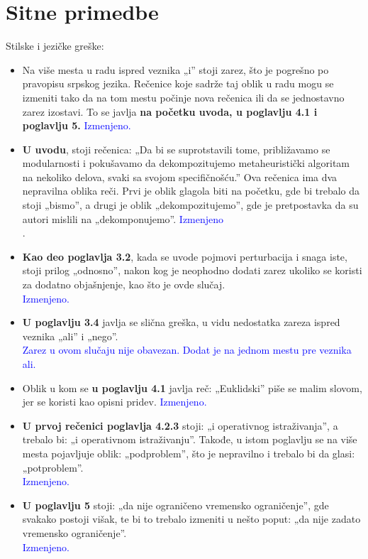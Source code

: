 \documentclass[a4paper]{report}
\newcommand{\odgovor}[1]{\textcolor{blue}{#1}}
\begin{document}
\section{Sitne primedbe}
Stilske i jezičke greške:
\begin{itemize}
 \item Na više mesta u radu ispred veznika „i” stoji zarez, što je pogrešno po pravopisu srpskog jezika. Rečenice koje sadrže taj oblik u radu mogu se izmeniti tako da na tom mestu počinje nova rečenica ili da se jednostavno zarez izostavi. To se javlja \textbf{na početku uvoda, u poglavlju 4.1 i poglavlju 5.}
 \odgovor{Izmenjeno.\\}
 
 \item \textbf{U uvodu}, stoji rečenica: „Da bi se suprotstavili tome, približavamo se modularnosti i pokušavamo da dekompozitujemo metaheuristički algoritam na nekoliko delova, svaki sa svojom specifičnošću.” Ova rečenica ima dva nepravilna oblika reči. Prvi je oblik glagola biti na početku, gde bi trebalo da stoji „bismo”, a drugi je oblik „dekompozitujemo”, gde je pretpostavka da su autori mislili na „dekomponujemo”.
 \odgovor{Izmenjeno\\}.
 
 \item \textbf{Kao deo poglavlja 3.2}, kada se uvode pojmovi perturbacija i snaga iste, stoji prilog „odnosno”, nakon kog je neophodno dodati zarez ukoliko se koristi za dodatno objašnjenje, kao što je ovde slučaj.\\
 \odgovor{Izmenjeno.\\}
 
 \item \textbf{U poglavlju 3.4} javlja se slična greška, u vidu nedostatka zareza ispred veznika „ali” i „nego”.\\
 \odgovor{Zarez u ovom slučaju nije obavezan. Dodat je na jednom mestu pre veznika ali.\\}
 
 \item Oblik u kom se \textbf{u poglavlju 4.1} javlja reč: „Euklidski” piše se malim slovom, jer se koristi kao opisni pridev.
 \odgovor{Izmenjeno.\\}
 \item \textbf{U prvoj rečenici poglavlja 4.2.3} stoji: „i operativnog istraživanja”, a trebalo bi: „i operativnom istraživanju”. Takođe, u istom poglavlju se na više mesta pojavljuje oblik: „podproblem”, što je nepravilno i trebalo bi da glasi: „potproblem”.\\
\odgovor{Izmenjeno.\\}
 
 \item \textbf{U poglavlju 5} stoji: „da nije ograničeno vremensko ograničenje”, gde svakako postoji višak, te bi to trebalo izmeniti u nešto poput: „da nije zadato vremensko ograničenje”.\\
\odgovor{Izmenjeno.\\}
\end{itemize}
\end{document}
